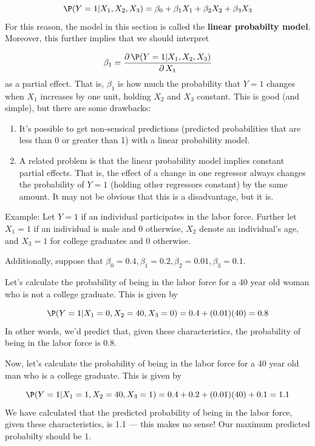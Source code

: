 \documentclass[
  letterpaper,
  DIV=11,
  numbers=noendperiod]{scrreprt}
\begin{document}
\[
  \P(Y=1|X_1,X_2,X_3) = \beta_0 + \beta_1 X_1 + \beta_2 X_2 + \beta_3 X_3
\] For this reason, the model in this section is called the
\textbf{linear probabilty model}. Moreover, this further implies that we
should interpret

\[
  \beta_1 = \frac{\partial \, \P(Y=1|X_1,X_2,X_3)}{\partial \, X_1}
\] as a partial effect. That is, \(\beta_1\) is how much the probability
that \(Y=1\) changes when \(X_1\) increases by one unit, holding \(X_2\)
and \(X_3\) constant. This is good (and simple), but there are some
drawbacks:

\begin{enumerate}
\def\labelenumi{\arabic{enumi}.}
\item
  It's possible to get non-sensical predictions (predicted probabilities
  that are less than 0 or greater than 1) with a linear probability
  model.
\item
  A related problem is that the linear probability model implies
  constant partial effects. That is, the effect of a change in one
  regressor always changes the probability of \(Y=1\) (holding other
  regressors constant) by the same amount. It may not be obvious that
  this is a disadvantage, but it is.
\end{enumerate}

{Example: }Let \(Y=1\) if an individual participates in the labor force.
Further let \(X_1=1\) if an individual is male and 0 otherwise, \(X_2\)
denote an individual's age, and \(X_3=1\) for college graduates and 0
otherwise.

Additionally, suppose that
\(\beta_0=0.4, \beta_1=0.2, \beta_2=0.01, \beta_3=0.1\).

Let's calculate the probability of being in the labor force for a 40
year old woman who is not a college graduate. This is given by

\[
  \P(Y=1 | X_1=0, X_2=40, X_3=0) = 0.4 + (0.01)(40) = 0.8
\] In other words, we'd predict that, given these characteristics, the
probability of being in the labor force is 0.8.

Now, let's calculate the probability of being in the labor force for a
40 year old man who is a college graduate. This is given by

\[
  \P(Y=1|X_1=1, X_2=40, X_3=1) = 0.4 + 0.2 + (0.01)(40) + 0.1 = 1.1
\] We have calculated that the predicted probability of being in the
labor force, given these characteristics, is 1.1 --- this makes no
sense! Our maximum predicted probabilty should be 1.
\end{document}
